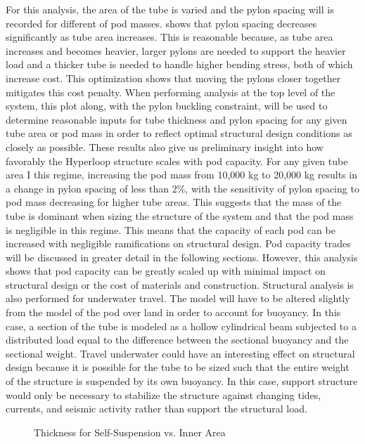 For this analysis, the area of the tube is varied and the pylon spacing will is recorded for different of pod masses.  shows that pylon spacing decreases significantly as tube area increases. This is reasonable because, as tube area increases and becomes heavier, larger pylons are needed to support the heavier load and a thicker tube is needed to handle higher bending stress, both of which increase cost. This optimization shows that moving the pylons closer together mitigates this cost penalty. When performing analysis at the top level of the system, this plot along, with the pylon buckling constraint, will be used to determine reasonable inputs for tube thickness and pylon spacing for any given tube area or pod mass in order to reflect optimal structural design conditions as closely as possible.
These results also give us preliminary insight into how favorably the Hyperloop structure scales with pod capacity. For any given tube area I this regime, increasing the pod mass from 10,000 kg to 20,000 kg results in a change in pylon spacing of less than 2\%, with the sensitivity of pylon spacing to pod mass decreasing for higher tube areas. This suggests that the mass of the tube is dominant when sizing the structure of the system and that the pod mass is negligible in this regime. This means that the capacity of each pod can be increased with negligible ramifications on structural design. Pod capacity trades will be discussed in greater detail in the following sections. However, this analysis shows that pod capacity can be greatly scaled up with minimal impact on structural design or the cost of materials and construction.
Structural analysis is also performed for underwater travel. The model will have to be altered slightly from the model of the pod over land in order to account for buoyancy. In this case, a section of the tube is modeled as a hollow cylindrical beam subjected to a distributed load equal to the difference between the sectional buoyancy and the sectional weight. Travel underwater could have an interesting effect on structural design because it is possible for the tube to be sized such that the entire weight of the structure is suspended by its own buoyancy. In this case, support structure would only be necessary to stabilize the structure against changing tides, currents, and seismic activity rather than support the structural load. 

\begin{figure}
	\centering
	\caption{Thickness for Self-Suspension vs. Inner Area}
	\label{fig:thick_susp_vs_area}
\end{figure}

